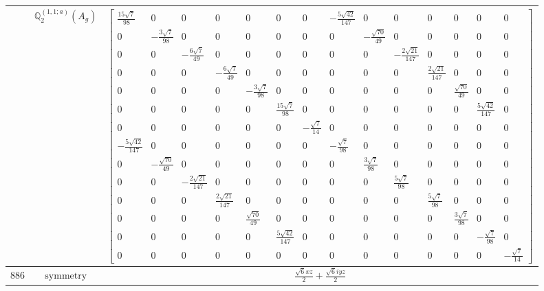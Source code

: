 \documentclass[fleqn,8pt,landscape]{jsarticle}
\begin{document}
\begin{longtable}{ccc}
$  $ & $ \mathbb{Q}_{2}^{(1,1;a)}(A_{g}) $ & $ \begin{bmatrix} \frac{15 \sqrt{7}}{98} & 0 & 0 & 0 & 0 & 0 & 0 & - \frac{5 \sqrt{42}}{147} & 0 & 0 & 0 & 0 & 0 & 0 \\ 0 & - \frac{3 \sqrt{7}}{98} & 0 & 0 & 0 & 0 & 0 & 0 & - \frac{\sqrt{70}}{49} & 0 & 0 & 0 & 0 & 0 \\ 0 & 0 & - \frac{6 \sqrt{7}}{49} & 0 & 0 & 0 & 0 & 0 & 0 & - \frac{2 \sqrt{21}}{147} & 0 & 0 & 0 & 0 \\ 0 & 0 & 0 & - \frac{6 \sqrt{7}}{49} & 0 & 0 & 0 & 0 & 0 & 0 & \frac{2 \sqrt{21}}{147} & 0 & 0 & 0 \\ 0 & 0 & 0 & 0 & - \frac{3 \sqrt{7}}{98} & 0 & 0 & 0 & 0 & 0 & 0 & \frac{\sqrt{70}}{49} & 0 & 0 \\ 0 & 0 & 0 & 0 & 0 & \frac{15 \sqrt{7}}{98} & 0 & 0 & 0 & 0 & 0 & 0 & \frac{5 \sqrt{42}}{147} & 0 \\ 0 & 0 & 0 & 0 & 0 & 0 & - \frac{\sqrt{7}}{14} & 0 & 0 & 0 & 0 & 0 & 0 & 0 \\ - \frac{5 \sqrt{42}}{147} & 0 & 0 & 0 & 0 & 0 & 0 & - \frac{\sqrt{7}}{98} & 0 & 0 & 0 & 0 & 0 & 0 \\ 0 & - \frac{\sqrt{70}}{49} & 0 & 0 & 0 & 0 & 0 & 0 & \frac{3 \sqrt{7}}{98} & 0 & 0 & 0 & 0 & 0 \\ 0 & 0 & - \frac{2 \sqrt{21}}{147} & 0 & 0 & 0 & 0 & 0 & 0 & \frac{5 \sqrt{7}}{98} & 0 & 0 & 0 & 0 \\ 0 & 0 & 0 & \frac{2 \sqrt{21}}{147} & 0 & 0 & 0 & 0 & 0 & 0 & \frac{5 \sqrt{7}}{98} & 0 & 0 & 0 \\ 0 & 0 & 0 & 0 & \frac{\sqrt{70}}{49} & 0 & 0 & 0 & 0 & 0 & 0 & \frac{3 \sqrt{7}}{98} & 0 & 0 \\ 0 & 0 & 0 & 0 & 0 & \frac{5 \sqrt{42}}{147} & 0 & 0 & 0 & 0 & 0 & 0 & - \frac{\sqrt{7}}{98} & 0 \\ 0 & 0 & 0 & 0 & 0 & 0 & 0 & 0 & 0 & 0 & 0 & 0 & 0 & - \frac{\sqrt{7}}{14} \end{bmatrix} $ \\ \hline
$ 886 $ & $ \text{symmetry} $ & $ \frac{\sqrt{6} x z}{2} + \frac{\sqrt{6} i y z}{2} $ \\

\end{longtable}
\end{document}
